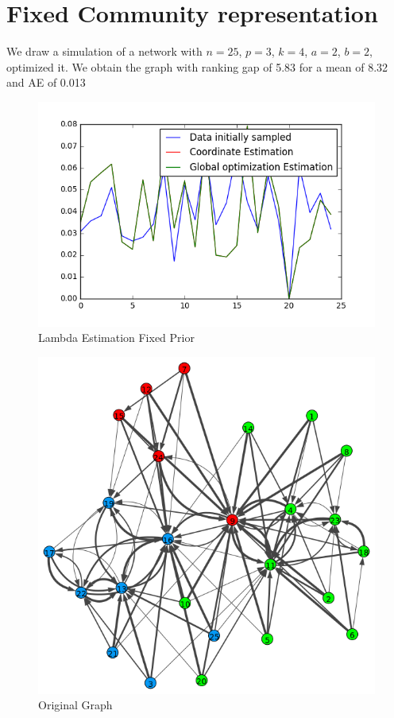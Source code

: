 \documentclass[12pt]{ociamthesis}  %
\begin{document}
	\section{Fixed Community representation}
	
	We draw a simulation of a network with $n = 25$, $ p = 3$, $k = 4$, $a = 2$, $b = 2$, optimized it. We obtain the graph with ranking gap of 5.83 for a mean of 8.32 and AE of 0.013
		
	\begin{figure}
		\centering
		\includegraphics[width=\textwidth,height=\textheight,keepaspectratio]{LambdaEstimationFixedPrior}
		\caption{Lambda Estimation Fixed Prior}
		\label{label-image9}
	\end{figure}
	
	\begin{figure}
		\centering
		\includegraphics[width=\textwidth,height=\textheight,keepaspectratio]{OriginalPlotFixedPrior}
		\caption{Original Graph}
		\label{label-image10}
	\end{figure}
	
\end{document}
